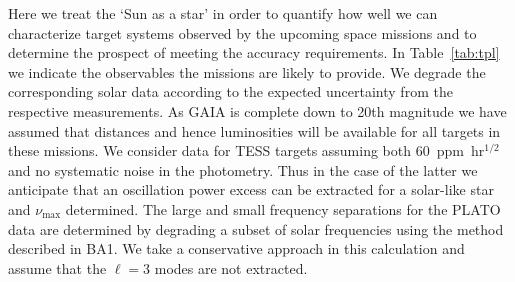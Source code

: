 Here we treat the `Sun as a star' in order to quantify how well we can characterize target systems observed by the 
upcoming space missions and to determine the prospect of meeting the accuracy requirements.  
In Table~\ref{tab:tpl} we indicate the observables the missions are likely to provide. 
We degrade the corresponding solar data according to the expected uncertainty from the respective measurements.   
As GAIA is complete down to 20th magnitude we have assumed that distances and hence luminosities will be available for all targets in these missions. We consider data for TESS targets assuming both $60$~ppm~hr$^{1/2}$ and no systematic noise in the photometry. Thus in the case of the latter we anticipate that an oscillation power excess can be extracted for a solar-like star and $\nu_{\max}$ determined. The large and small frequency separations for the PLATO data are determined by degrading a subset of solar frequencies using the method described in BA1. We take a conservative approach in this calculation and assume that the ${\ell=3}$ modes are not extracted.




